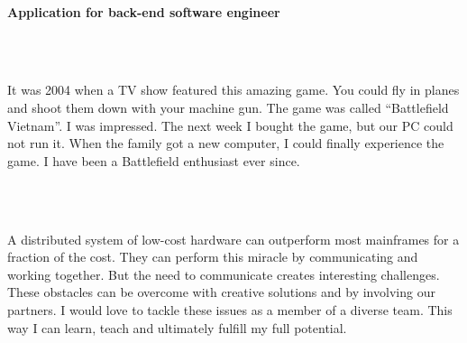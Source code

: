 \documentclass[11pt,a4paper,arial]{moderncv}        %
\begin{document}
\date{2017-05-01}

\makelettertitle

~\\

\textbf {Application for back-end software engineer}

~\\
~

It was 2004 when a TV show featured this amazing game. You could fly in planes and shoot them down with your machine gun. The game was
called ``Battlefield Vietnam''. I was impressed. The next week I bought the game, but our PC could not run it.
When the family got a new computer, I could finally experience the game. I have been a Battlefield enthusiast ever since.

~\\
~

A distributed system of low-cost hardware can outperform most mainframes for a fraction of the cost.
They can perform this miracle by communicating and working together. But the need to communicate creates interesting challenges.
These obstacles can be overcome with creative solutions and by involving our partners. I would love to tackle these issues
as a member of a diverse team. This way I can learn, teach and ultimately fulfill my full potential.



~\\
~
\end{document}
